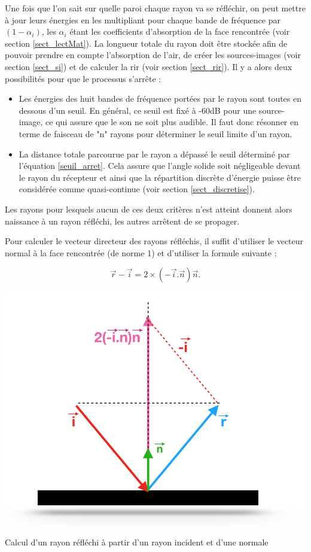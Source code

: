 Une fois que l'on sait sur quelle paroi chaque rayon va se réfléchir, on peut mettre à jour leurs énergies en les multipliant pour chaque bande de fréquence par $(1-\alpha_i)$, les $\alpha_i$ étant les coefficients d'absorption de la face rencontrée (voir section \ref{sect_lectMat}). La longueur totale du rayon doit être stockée afin de pouvoir prendre en compte l'absorption de l'air, de créer les sources-images (voir section \ref{sect_si}) et de calculer la \gls{rir}  (voir section \ref{sect_rir}). Il y a alors deux possibilités pour que le processus s'arrête : 
\begin{itemize}
	\item Les énergies des huit bandes de fréquence portées par le rayon sont toutes en dessous d'un seuil. En général, ce seuil est fixé à -60dB pour une source-image, ce qui assure que le son ne soit plus audible. Il faut donc résonner en terme de faisceau de "n" rayons pour déterminer le seuil limite d'un rayon.
	\item La distance totale parcourue par le rayon a dépassé le seuil déterminé par l'équation \ref{seuil_arret}. Cela assure que l'angle solide soit négligeable devant le rayon du récepteur et ainsi que la répartition discrète d'énergie puisse être considérée comme quasi-continue (voir section \ref{sect_discretise}).
\end{itemize}
%
Les rayons pour lesquels aucun de ces deux critères n'est atteint donnent alors naissance à un rayon réfléchi, les autres arrêtent de se propager. 


Pour calculer le vecteur directeur des rayons réfléchis, il suffit d'utiliser le vecteur normal à la face rencontrée (de norme 1) et d'utiliser la formule suivante :

\begin{equation}
\overrightarrow{r} - \overrightarrow{i} = 2 \times (-\overrightarrow{i}.\overrightarrow{n})\overrightarrow{n}.
\end{equation}

\begin{figureth}
	\includegraphics[width=0.6\linewidth]{images/rayRefl}
	\caption{Calcul d'un rayon réfléchi à partir d'un rayon incident et d'une normale}
	\label{rayRefl}
\end{figureth}

